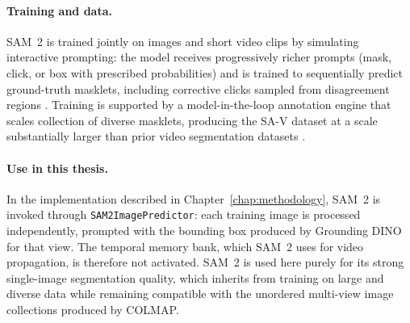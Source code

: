 \paragraph{Training and data.}
SAM~2 is trained jointly on images and short video clips by simulating interactive prompting: the model receives progressively richer prompts (mask, click, or box with prescribed probabilities) and is trained to sequentially predict ground-truth masklets, including corrective clicks sampled from disagreement regions \cite{ravi2024sam2}. Training is supported by a model-in-the-loop annotation engine that scales collection of diverse masklets, producing the SA-V dataset at a scale substantially larger than prior video segmentation datasets \cite{ravi2024sam2}.

\paragraph{Use in this thesis.}
In the implementation described in Chapter~\ref{chap:methodology}, SAM~2 is invoked through \texttt{SAM2ImagePredictor}: each training image is processed independently, prompted with the bounding box produced by Grounding DINO for that view. The temporal memory bank, which SAM~2 uses for video propagation, is therefore not activated. SAM~2 is used here purely for its strong single-image segmentation quality, which inherits from training on large and diverse data while remaining compatible with the unordered multi-view image collections produced by COLMAP.

